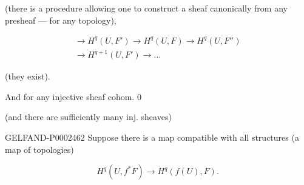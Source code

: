 (there is a procedure allowing one to construct a sheaf canonically from any presheaf — for any topology),



\begin{gather*}
\longrightarrow H^q (U, F')\longrightarrow H^q (U, F)\longrightarrow H^q (U, F'')\\
\longrightarrow H^{q+1}(U, F')\longrightarrow\ldots
\end{gather*}



(they exist).



And for any injective sheaf cohom. $0$



(and there are sufficiently many inj. sheaves)



\begin{GelfandAdjacentEvidence}{GELFAND-P000246}{2}
Suppose there is a map compatible with all structures (a map of topologies)




\end{GelfandAdjacentEvidence}

\begin{equation*}H^q (U, f^*F)\longrightarrow H^q (f (U), F).\end{equation*}



